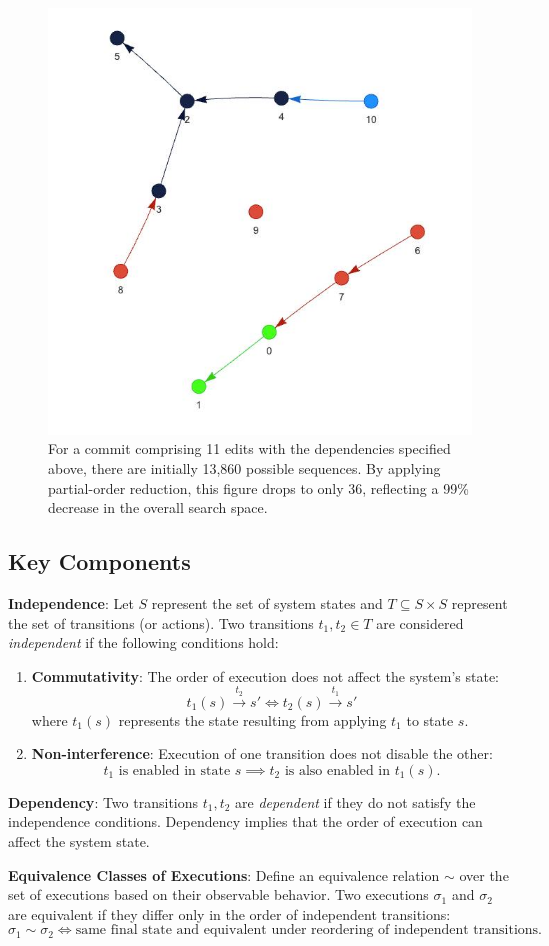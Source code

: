 \begin{figure}
    \centering
    \includegraphics[width=0.5\linewidth]{fig/partial-orders.png}
    \caption{For a commit comprising 11 edits with the dependencies specified above, there are initially 13,860 possible sequences. By applying partial-order reduction, this figure drops to only 36, reflecting a 99\% decrease in the overall search space.}
    \label{fig:partial-order}
\end{figure}

\subsection{Key Components}

\textbf{Independence}: Let \( S \) represent the set of system states and \( T \subseteq S \times S \) represent the set of transitions (or actions). Two transitions \( t_1, t_2 \in T \) are considered \textit{independent} if the following conditions hold:
\begin{enumerate}
    \item \textbf{Commutativity}: The order of execution does not affect the system's state:
    \[
    t_1(s) \xrightarrow{t_2} s' \iff t_2(s) \xrightarrow{t_1} s'
    \]
    where \( t_1(s) \) represents the state resulting from applying \( t_1 \) to state \( s \).
    \item \textbf{Non-interference}: Execution of one transition does not disable the other:
    \[
    t_1 \text{ is enabled in state } s \implies t_2 \text{ is also enabled in } t_1(s).
    \]
\end{enumerate}

\textbf{Dependency}: Two transitions \( t_1, t_2 \) are \textit{dependent} if they do not satisfy the independence conditions. Dependency implies that the order of execution can affect the system state. 

\textbf{Equivalence Classes of Executions}: Define an equivalence relation \( \sim \) over the set of executions based on their observable behavior. Two executions \( \sigma_1 \) and \( \sigma_2 \) are equivalent if they differ only in the order of independent transitions:
\[
\sigma_1 \sim \sigma_2 \iff \text{same final state and equivalent under reordering of independent transitions.}
\]

